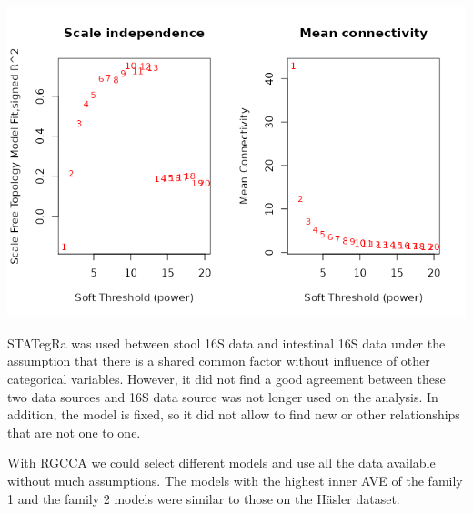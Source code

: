 \documentclass[
  a4paper,
]{book}
\let\origfigure\figure
\let\endorigfigure\endfigure
\renewenvironment{figure}[1][2] {
    \expandafter\origfigure\expandafter[!ht]
} {
    \endorigfigure
}
\begin{document}
\begin{figure}
\centering
\includegraphics{images/hsct-wgcna-power.png}
\caption{\label{fig:hsct-wgcna-power} Power evaluation of WGCNA of the HSCT dataset. On the ordinate the power on the abscissa on the left the scale free topology model fit; on the right the mean connectivity. There is a low fit even on large power and the mean connectivity is below 100 from the very first value.}
\end{figure}

STATegRa was used between stool 16S data and intestinal 16S data under the assumption that there is a shared common factor without influence of other categorical variables.
However, it did not find a good agreement between these two data sources and 16S data source was not longer used on the analysis.
In addition, the model is fixed, so it did not allow to find new or other relationships that are not one to one.

With RGCCA we could select different models and use all the data available without much assumptions.
The models with the highest inner AVE of the family 1 and the family 2 models were similar to those on the Häsler dataset.
\end{document}
